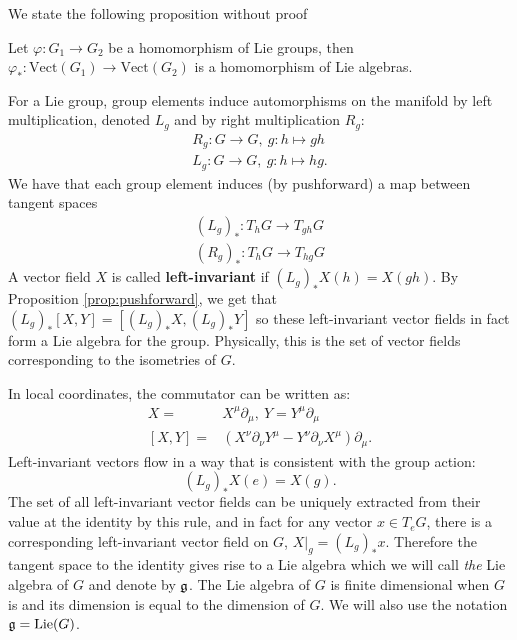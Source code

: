 		We state the following proposition without proof
		\begin{prop}\label{prop:pushforward}
			Let $\varphi: G_1 \rightarrow G_2$ be a homomorphism of Lie groups, then $\varphi_*: \mathrm{Vect}(G_1) \rightarrow \mathrm{Vect}(G_2)$ is a homomorphism of Lie algebras. 
		\end{prop}
		
		For a Lie group, group elements induce automorphisms on the manifold by left multiplication, denoted $L_g$ and by right multiplication $R_g$:
		\[
			\begin{aligned}
				R_g: G \rightarrow G, ~ g: h \mapsto gh\\
				L_g: G \rightarrow G, ~ g: h \mapsto hg.
			\end{aligned}
		\]
		 We have that each group element induces (by pushforward) a map between tangent spaces 
		\[
		 	\begin{aligned}
		 		(L_g)_*: T_h G \rightarrow T_{gh} G\\
				(R_g)_*: T_h G \rightarrow T_{hg} G
		 	\end{aligned}
		\]
		A vector field $X$ is called \textbf{left-invariant} if $(L_g)_* X(h) = X(gh)$. 
		By Proposition \ref{prop:pushforward}, we get that $(L_g)_* [X, Y] = [(L_g)_* X, (L_g)_* Y]$ so these left-invariant vector fields in fact form a Lie algebra for the group. Physically, this is the set of vector fields corresponding to the isometries of $G$.
		
		In local coordinates, the commutator can be written as:
		\[
			\begin{aligned}
				X = &X^\mu \partial_\mu, ~ Y = Y^\mu \partial_\mu\\
				[X,Y] = &(X^\nu \partial_\nu Y^\mu - Y^\nu \partial_\nu X^\mu) \partial_\mu.
			\end{aligned}
		\]
		Left-invariant vectors flow in a way that is consistent with the group action:
		\[
			(L_g)_* X(e) = X(g).
		\]
		The set of all left-invariant vector fields can be uniquely extracted from their value at the identity by this rule, and in fact for any vector $x \in T_e G$, there is a corresponding left-invariant vector field on $G$, $X|_g = (L_g)_* x$. Therefore the tangent space to the identity gives rise to a Lie algebra which we will call \emph{the} Lie algebra of $G$ and denote by $\frak g$. The Lie algebra of $G$ is finite dimensional when $G$ is and its dimension is equal to the dimension of $G$. We will also use the notation $\frak g = \mathrm{Lie}(G)$.
		
